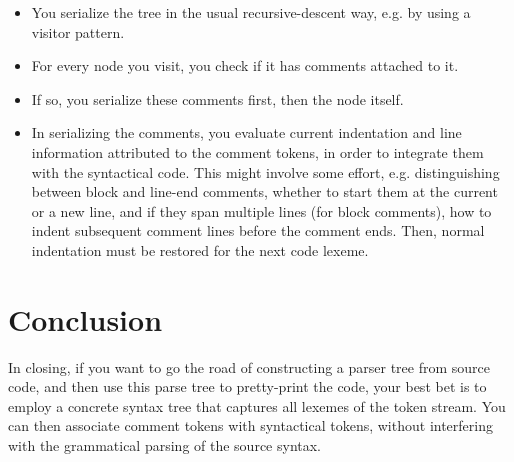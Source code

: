 \documentclass[11pt,a4paper]{article}
\begin{document}
\begin{itemize}
\item You serialize the tree in the usual recursive-descent way, e.g. by using a
visitor pattern.
\item For every node you visit, you check if it has comments attached to it.
\item If so, you serialize these comments first, then the node itself.
\item In serializing the comments, you evaluate current indentation and line
information attributed to the comment tokens, in order to integrate them with
the syntactical code. This might involve some effort, e.g. distinguishing
between block and line-end comments, whether to start them at the current or a
new line, and if they span multiple lines (for block comments), how to indent
subsequent comment lines before the comment ends. Then, normal indentation
must be restored for the next code lexeme.
\end{itemize}

\section{Conclusion}

In closing, if you want to go the road of constructing a parser tree from source
code, and then use this parse tree to pretty-print the code, your best bet is to
employ a concrete syntax tree that captures all lexemes of the token stream. You
can then associate comment tokens with syntactical tokens, without interfering
with the grammatical parsing of the source syntax. 




\end{document}
